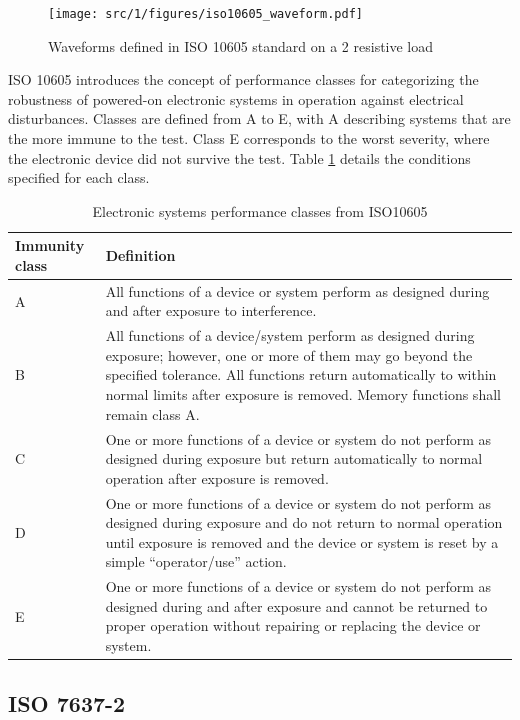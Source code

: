 \begin{figure}[!h]
  \centering
  \texttt{[image: src/1/figures/iso10605\_waveform.pdf]}
  \caption{Waveforms defined in ISO 10605 standard on a 2\textOmega{} resistive load}
  \label{iso_pulse}
\end{figure}


ISO 10605 introduces the concept of performance classes for categorizing the robustness of powered-on electronic systems in operation against electrical disturbances.
Classes are defined from A to E, with A describing systems that are the more immune to the test.
Class E corresponds to the worst severity, where the electronic device did not survive the test.
Table \ref{tab:iso-class-a-levels} details the conditions specified for each class.

\begin{table}[!h]
\centering
\begin{tabular}{l|p{}}
Immunity class  & Definition   \\ \midrule
A  & All functions of a device or system perform as designed during and after exposure to interference.  \\ \midrule
B  & All functions of a device/system perform as designed during exposure; however, one or more of them may go beyond the specified tolerance. All functions return automatically to within normal limits after exposure is removed. Memory functions shall remain class A. \\ \midrule
C  & One or more functions of a device or system do not perform as designed during exposure but return automatically to normal operation after exposure is removed.   \\ \midrule
D  &  One or more functions of a device or system do not perform as designed during exposure and do not return to normal operation until exposure is removed and the device or system is reset by a simple “operator/use” action.   \\ \midrule
E   &  One or more functions of a device or system do not perform as designed during and after exposure and cannot be returned to proper operation without repairing or replacing the device or system.  \\
\bottomrule
\end{tabular}
\caption{Electronic systems performance classes from ISO10605}
\label{tab:iso-class-a-levels}
\end{table}

\subsection{ISO 7637-2}

